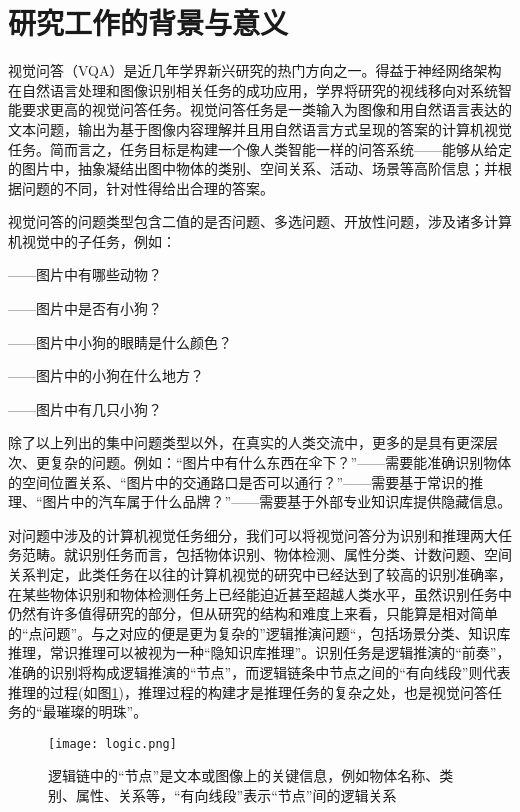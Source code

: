 \thesischapterexordium

\section{研究工作的背景与意义}

视觉问答（VQA）是近几年学界新兴研究的热门方向之一。得益于神经网络架构在自然语言处理和图像识别相关任务的成功应用，学界将研究的视线移向对系统智能要求更高的视觉问答任务。视觉问答任务是一类输入为图像和用自然语言表达的文本问题，输出为基于图像内容理解并且用自然语言方式呈现的答案的计算机视觉任务。简而言之，任务目标是构建一个像人类智能一样的问答系统——能够从给定的图片中，抽象凝结出图中物体的类别、空间关系、活动、场景等高阶信息；并根据问题的不同，针对性得给出合理的答案。

视觉问答的问题类型包含二值的是否问题、多选问题、开放性问题，涉及诸多计算机视觉中的子任务，例如：
\begin{description}[labelindent=2em, leftmargin=6em, style=sameline]
\item [物体识别]——图片中有哪些动物？
\item [物体检测]——图片中是否有小狗？
\item [属性分类]——图片中小狗的眼睛是什么颜色？
\item [场景分类]——图片中的小狗在什么地方？
\item [计数问题]——图片中有几只小狗？
\end{description}
除了以上列出的集中问题类型以外，在真实的人类交流中，更多的是具有更深层次、更复杂的问题。例如：“图片中有什么东西在伞下？”——需要能准确识别物体的空间位置关系、“图片中的交通路口是否可以通行？”——需要基于常识的推理、“图片中的汽车属于什么品牌？”——需要基于外部专业知识库提供隐藏信息。

对问题中涉及的计算机视觉任务细分，我们可以将视觉问答分为识别和推理两大任务范畴。就识别任务而言，包括物体识别、物体检测、属性分类、计数问题、空间关系判定，此类任务在以往的计算机视觉的研究中已经达到了较高的识别准确率，在某些物体识别和物体检测任务上已经能迫近甚至超越人类水平，虽然识别任务中仍然有许多值得研究的部分，但从研究的结构和难度上来看，只能算是相对简单的“点问题”。与之对应的便是更为复杂的”逻辑推演问题“，包括场景分类、知识库推理，常识推理可以被视为一种“隐知识库推理”。识别任务是逻辑推演的“前奏”，准确的识别将构成逻辑推演的“节点”，而逻辑链条中节点之间的“有向线段”则代表推理的过程(如图\ref{logic})，推理过程的构建才是推理任务的复杂之处，也是视觉问答任务的“最璀璨的明珠”。
\begin{figure}[H]
	\texttt{[image: logic.png]}
	\caption{逻辑链中的“节点”是文本或图像上的关键信息，例如物体名称、类别、属性、关系等，“有向线段”表示“节点”间的逻辑关系}
	\label{logic}
\end{figure}

